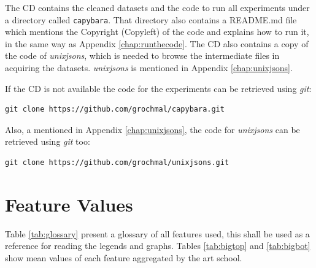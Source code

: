 \documentclass[11pt,a4paper,twoside,openright]{report}
\begin{document}
The CD contains the cleaned datasets and the code to run all experiments under
a directory called \texttt{capybara}.  That directory also contains a README.md
file which mentions the Copyright (Copyleft) of the code and explains how to
run it, in the same way as Appendix \ref{chap:runthecode}.  The CD also
contains a copy of the code of \emph{unixjsons}, which is needed to browse the
intermediate files in acquiring the datasets.  \emph{unixjsons} is mentioned in
Appendix \ref{chap:unixjsons}.

If the CD is not available the code for the experiments can be retrieved using
\emph{git}:

\begin{verbatim}
git clone https://github.com/grochmal/capybara.git
\end{verbatim}

Also, a mentioned in Appendix \ref{chap:unixjsons}, the code for
\emph{unixjsons} can be retrieved using \emph{git} too:

\begin{verbatim}
git clone https://github.com/grochmal/unixjsons.git
\end{verbatim}

\chapter{Feature Values}
\label{chap:glossary}

Table \ref{tab:glossary} present a glossary of all features used, this shall be
used as a reference for reading the legends and graphs.  Tables
\ref{tab:bigtop} and \ref{tab:bigbot} show mean values of each feature
aggregated by the art school.
\end{document}
